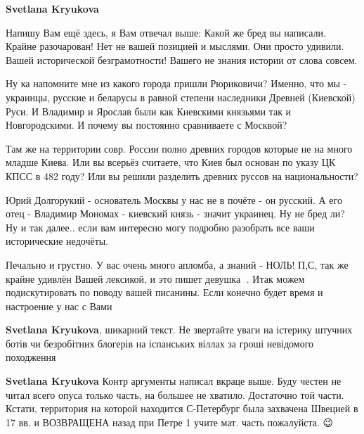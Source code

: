 \begin{itemize}
\begin{itemize}
\textbf{Svetlana Kryukova} 

Напишу Вам ещё здесь, я Вам отвечал выше: Какой же бред вы написали. Крайне
разочарован! Нет не вашей позицией и мыслями. Они просто удивили. Вашей
исторической безграмотности! Вашего не знания истории от слова совсем. 

Ну ка напомните мне из какого города пришли Рюриковичи? Именно, что мы -
украинцы, русские и беларусы в равной степени наследники Древней (Киевской)
Руси. И Владимир и Ярослав были как Киевскими князьями так и Новгородскими. И
почему вы постоянно сравниваете с Москвой? 

Там же на территории совр. России полно древних городов которые не на много
младше Киева. Или вы всерьёз считаете, что Киев был основан по указу ЦК КПСС в
482 году? Или вы решили разделить древних руссов на национальности? 

Юрий Долгорукий - основатель Москвы у нас не в почёте - он русский. А его отец
- Владимир Мономах - киевский князь - значит украинец. Ну не бред ли? Ну и так
далее.. если вам интересно могу подробно разобрать все ваши исторические
недочёты. 

Печально и грустно. У вас очень много апломба, а знаний - НОЛЬ! П,С, так же
крайне удивлён Вашей лексикой, и это пишет девушка 🙁. Итак можем
подискутировать по поводу вашей писанины. Если конечно будет время и настроение
у нас с Вами \Smiley[1.0][yellow]

 
\textbf{Svetlana Kryukova}, шикарний текст. Не звертайте уваги на істерику штучних ботів чи безробітних блогерів на іспанських віллах за гроші невідомого походження

 
\textbf{Svetlana Kryukova} Контр аргументы написал вкраце выше. Буду честен не читал всего опуса только часть, на большее не хватило. Достаточно той части. Кстати, территория на которой находится С-Петербург была захвачена Швецией в 17 вв. и ВОЗВРАЩЕНА назад при Петре 1 учите мат. часть пожалуйста. 😉

 

\end{itemize}
\end{itemize}
